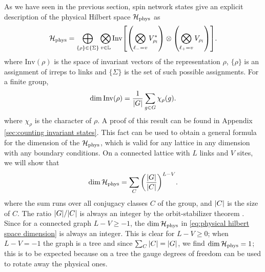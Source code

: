As we have seen in the previous section, spin network states give an explicit description of the physical Hilbert space $\mathcal{H}_{\text{phys}}$ as
\begin{equation}
    \HilbertPhys =\bigoplus_{\{\rho\} \in \{\Sigma\}} \bigotimes_{v \in \Lattice} \mathrm{Inv}\bqty{\pqty{\bigotimes_{\link_{-} = v}  V_{\rho_l}^*} \otimes \pqty{\bigotimes_{\link_{+} = v}  V_{\rho_l}}}.
\end{equation}
where $\mathrm{Inv}(\rho)$ is the space of invariant vectors of the representation $\rho$, $\{\rho\}$ is an assignment of irreps to links and $\{\Sigma\}$ is the set of such possible assignments. For a finite group,
\begin{equation}
    \label{eq:invariant vectors counting}
    \dim{\mathrm{Inv}(\rho)} = \frac{1}{\abs{G}} \sum_{g \in G} \chi_\rho(g).
\end{equation}
where $\chi_\rho$ is the character of $\rho$. A proof of this result can be found in Appendix \ref{sec:counting invariant states}. This fact can be used to obtain a general formula for the dimension of the $\mathcal{H}_{\text{phys}}$, which is valid for any lattice in any dimension with any boundary conditions. On a connected lattice with $L$ links and $V$ sites, we will show that
\begin{equation}
    \label{eq:physical hilbert space dimension}
    \dim{\HilbertPhys} = \sum_C \pqty{\frac{\abs{G}}{\abs{C}}}^{L-V}.
\end{equation}
where the sum runs over all conjugacy classes $C$ of the group, and $\abs{C}$ is the size of $C$. The ratio $\abs{G}/\abs{C}$ is always an integer by the orbit-stabilizer theorem \cite{serre1967representations}.
Since for a connected graph $L-V \geq -1$, the $\dim{\mathcal{H}_{\text{phys}}}$ in \eqref{eq:physical hilbert space dimension} is always an integer.
This is clear for $L-V \geq 0$; when $L-V=-1$ the graph is a tree and since $\sum_C \abs{C}=\abs{G}$, we find $\dim{\mathcal{H}_{\text{phys}}}=1$; this is to be expected because on a tree the gauge degrees of freedom can be used to rotate away the physical ones.

